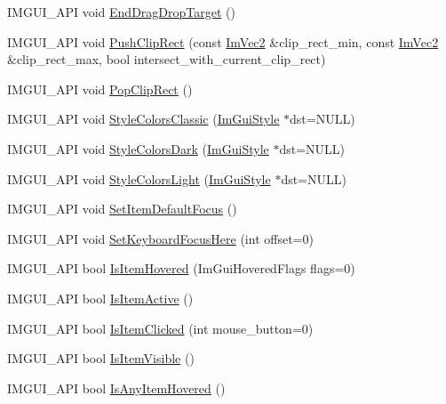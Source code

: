 \begin{DoxyCompactItemize}
\item 
I\+M\+G\+U\+I\+\_\+\+A\+PI void \hyperlink{namespace_im_gui_ae8313266214728f86c2cb7cb30a30e89}{End\+Drag\+Drop\+Target} ()
\item 
I\+M\+G\+U\+I\+\_\+\+A\+PI void \hyperlink{namespace_im_gui_a11c8bd8676e1281e15b24c9615b6904a}{Push\+Clip\+Rect} (const \hyperlink{struct_im_vec2}{Im\+Vec2} \&clip\+\_\+rect\+\_\+min, const \hyperlink{struct_im_vec2}{Im\+Vec2} \&clip\+\_\+rect\+\_\+max, bool intersect\+\_\+with\+\_\+current\+\_\+clip\+\_\+rect)
\item 
I\+M\+G\+U\+I\+\_\+\+A\+PI void \hyperlink{namespace_im_gui_aef1c8a6e5a3c70cb10d03d2a2a66dfd8}{Pop\+Clip\+Rect} ()
\item 
I\+M\+G\+U\+I\+\_\+\+A\+PI void \hyperlink{namespace_im_gui_a1cf931a42a10f71150def3ce222434b6}{Style\+Colors\+Classic} (\hyperlink{struct_im_gui_style}{Im\+Gui\+Style} $\ast$dst=N\+U\+LL)
\item 
I\+M\+G\+U\+I\+\_\+\+A\+PI void \hyperlink{namespace_im_gui_a26c67fc14081b359566d5e135cd8c767}{Style\+Colors\+Dark} (\hyperlink{struct_im_gui_style}{Im\+Gui\+Style} $\ast$dst=N\+U\+LL)
\item 
I\+M\+G\+U\+I\+\_\+\+A\+PI void \hyperlink{namespace_im_gui_ae1fc558bfbc557b228d63f7facfc86e1}{Style\+Colors\+Light} (\hyperlink{struct_im_gui_style}{Im\+Gui\+Style} $\ast$dst=N\+U\+LL)
\item 
I\+M\+G\+U\+I\+\_\+\+A\+PI void \hyperlink{namespace_im_gui_a3720a69496e9b8cf110a11dfe7d334e6}{Set\+Item\+Default\+Focus} ()
\item 
I\+M\+G\+U\+I\+\_\+\+A\+PI void \hyperlink{namespace_im_gui_ae85e5fba7e88cea8bd3ba5b687c979f2}{Set\+Keyboard\+Focus\+Here} (int offset=0)
\item 
I\+M\+G\+U\+I\+\_\+\+A\+PI bool \hyperlink{namespace_im_gui_ac9a400eff3a9561d95e80486c52a660b}{Is\+Item\+Hovered} (Im\+Gui\+Hovered\+Flags flags=0)
\item 
I\+M\+G\+U\+I\+\_\+\+A\+PI bool \hyperlink{namespace_im_gui_a2d8ac4569456a8003e4dddd39caf771c}{Is\+Item\+Active} ()
\item 
I\+M\+G\+U\+I\+\_\+\+A\+PI bool \hyperlink{namespace_im_gui_a0b5780dbd580e28f5d31f39da80b0b01}{Is\+Item\+Clicked} (int mouse\+\_\+button=0)
\item 
I\+M\+G\+U\+I\+\_\+\+A\+PI bool \hyperlink{namespace_im_gui_a0e9273fc53bdf7ca39d59cdb657c3c2f}{Is\+Item\+Visible} ()
\item 
I\+M\+G\+U\+I\+\_\+\+A\+PI bool \hyperlink{namespace_im_gui_a0512146617bb55e24ebcfbe3ce6553d5}{Is\+Any\+Item\+Hovered} ()

\end{DoxyCompactItemize}
